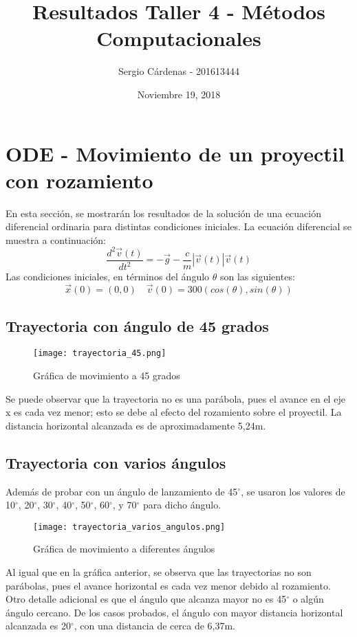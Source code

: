 \documentclass{article}
\title{Resultados Taller 4 - Métodos Computacionales}
\author{Sergio Cárdenas - 201613444}
\date{Noviembre 19, 2018}
\begin{document}
\maketitle
\section{ODE - Movimiento de un proyectil con rozamiento}
En esta sección, se mostrarán los resultados de la solución de una ecuación diferencial ordinaria para distintas condiciones iniciales. La ecuación diferencial se muestra a continuación:
\begin{equation}
    \frac{d^{2}\vec{v}(t)}{dt^{2}}=-\vec{g}-\frac{c}{m}|\vec{v}(t)|\vec{v}(t)
\end{equation}
Las condiciones iniciales, en términos del ángulo $\theta$ son las siguientes:
\begin{equation}
    \vec{x}(0)=(0,0) \quad \vec{v}(0)=300(cos(\theta),sin(\theta))
\end{equation}
\subsection*{Trayectoria con ángulo de 45 grados}

\begin{figure}[H]
    \centering
    \texttt{[image: trayectoria\_45.png]}
    \caption{Gráfica de movimiento a 45 grados}
    \label{fig:my_label}
\end{figure}

Se puede observar que la trayectoria no es una parábola, pues el avance en el eje x es cada vez menor; esto se debe al efecto del rozamiento sobre el proyectil. La distancia horizontal alcanzada es de aproximadamente 5,24m.

\subsection*{Trayectoria con varios ángulos}
Además de probar con un ángulo de lanzamiento de 45$^\circ$, se usaron los valores de 10$^\circ$, 20$^\circ$, 30$^\circ$, 40$^\circ$, 50$^\circ$, 60$^\circ$, y 70$^\circ$ para dicho ángulo.
\begin{figure}[H]
    \centering
    \texttt{[image: trayectoria\_varios\_angulos.png]}
    \caption{Gráfica de movimiento a diferentes ángulos}
    \label{fig:my_label}
\end{figure}

Al igual que en la gráfica anterior, se observa que las trayectorias no son parábolas, pues el avance horizontal es cada vez menor debido al rozamiento. Otro detalle adicional es que el ángulo que alcanza mayor no es 45$^\circ$ o algún ángulo cercano. De los casos probados, el ángulo con mayor distancia horizontal alcanzada es 20$^\circ$, con una distancia de cerca de 6,37m.
\end{document}
